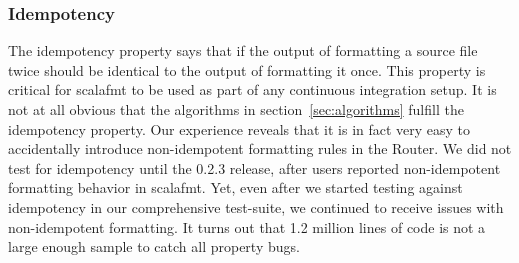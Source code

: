 \subsubsection{Idempotency}
The idempotency property says that if the output of formatting a source file twice should be identical to the output of formatting it once.
This property is critical for scalafmt to be used as part of any continuous integration setup.
It is not at all obvious that the algorithms in section~\ref{sec:algorithms} fulfill the idempotency property.
Our experience reveals that it is in fact very easy to accidentally introduce non-idempotent formatting rules in the Router.
We did not test for idempotency until the 0.2.3 release, after users reported non-idempotent formatting behavior in scalafmt.
Yet, even after we started testing against idempotency in our comprehensive test-suite, we continued to receive issues with non-idempotent formatting.
It turns out that 1.2 million lines of code is not a large enough sample to catch all property bugs.

